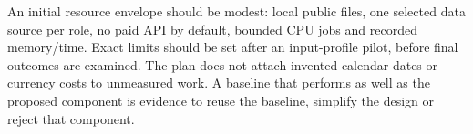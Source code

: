 An initial resource envelope should be modest: local public files, one
selected data source per role, no paid API by default, bounded CPU jobs
and recorded memory/time. Exact limits should be set after an
input-profile pilot, before final outcomes are examined. The plan does
not attach invented calendar dates or currency costs to unmeasured work.
A baseline that performs as well as the proposed component is evidence
to reuse the baseline, simplify the design or reject that component.

